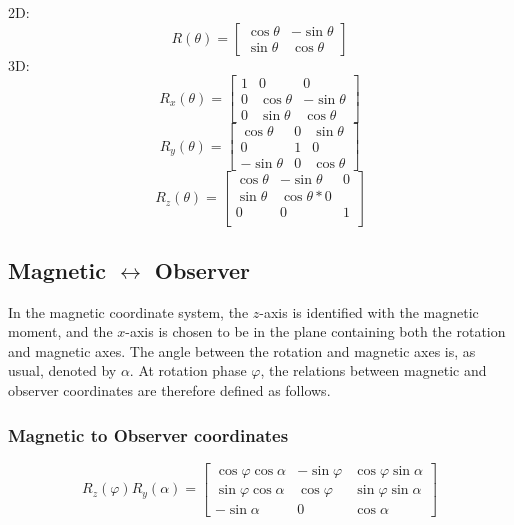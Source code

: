 \documentclass[twocolumn]{article}
\newcommand{\phase}{\varphi}
\begin{document}
2D:
\begin{equation}
    R(\theta) = \begin{bmatrix}
        \cos\theta & -\sin\theta \\
        \sin\theta & \cos\theta
    \end{bmatrix}
\end{equation}
3D:
\begin{equation}
    R_x(\theta) = \begin{bmatrix}
        1 & 0 & 0 \\
        0 & \cos\theta & -\sin\theta \\
        0 & \sin\theta & \cos\theta
    \end{bmatrix}
\end{equation}
\begin{equation}
    R_y(\theta) = \begin{bmatrix}
        \cos\theta & 0 & \sin\theta \\
        0 & 1 & 0 \\
        -\sin\theta & 0 & \cos\theta
    \end{bmatrix}
\end{equation}
\begin{equation}
    R_z(\theta) = \begin{bmatrix}
        \cos\theta & -\sin\theta & 0 \\
        \sin\theta & \cos\theta * 0 \\
        0 & 0 & 1 \\
    \end{bmatrix}
\end{equation}

\subsection{Magnetic $\leftrightarrow$ Observer}

In the magnetic coordinate system, the $z$-axis is identified with the magnetic moment, and the $x$-axis is chosen to be in the plane containing both the rotation and magnetic axes.
The angle between the rotation and magnetic axes is, as usual, denoted by $\alpha$.
At rotation phase $\phase$, the relations between magnetic and observer coordinates are therefore defined as follows.

\subsubsection*{Magnetic to Observer coordinates}
\begin{equation}
    R_z(\phase) R_y(\alpha) =
    \begin{bmatrix}
        \cos\phase\cos\alpha & -\sin\phase & \cos\phase\sin\alpha \\
        \sin\phase\cos\alpha &  \cos\phase & \sin\phase\sin\alpha \\
        -\sin\alpha          & 0           & \cos\alpha
    \end{bmatrix}
\end{equation}
\end{document}
